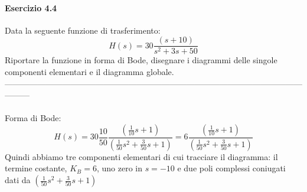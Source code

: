 \documentclass[12pt,a4paper]{article}
\begin{document}
	\paragraph*{Esercizio 4.4} Data la seguente funzione di trasferimento:
	\[
		H(s) = 30\frac{(s+10)}{s^2+3s+50}
	\]
	Riportare la funzione in forma di Bode, disegnare i diagrammi delle singole componenti elementari e il diagramma globale.\\
	---------------------------------------------------------------------------------------------------------------------\\ \\
	Forma di Bode:
	\[
		H(s) = 30\frac{10}{50}\frac{\left(\frac{1}{10}s+1\right)}{\left(\frac{1}{50}s^2+\frac{3}{50}s+1\right)} = 6\frac{\left(\frac{1}{10}s+1\right)}{\left(\frac{1}{50}s^2+\frac{3}{50}s+1\right)} 
	\]
	Quindi abbiamo tre componenti elementari di cui tracciare il diagramma: il termine costante, $K_B = 6$, uno zero in $s = -10$ e due poli complessi coniugati dati da $\left(\frac{1}{50}s^2+\frac{3}{50}s+1\right)$\\
\end{document}
